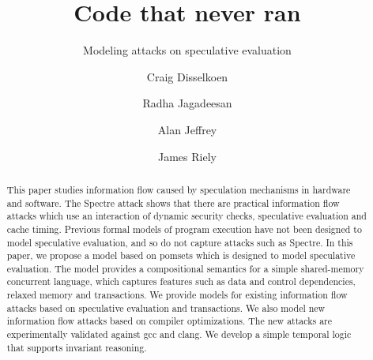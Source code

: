 \documentclass[acmsmall]{acmart}
\begin{document}
\title{Code that never ran}
\subtitle{Modeling attacks on speculative evaluation}

\author{Craig Disselkoen}

\author{Radha Jagadeesan}

\author{Alan Jeffrey}

\author{James Riely}

\begin{abstract}
  This paper studies information flow caused by speculation mechanisms
  in hardware and software.  The Spectre attack shows that there are
  practical information flow attacks which use an interaction of
  dynamic security checks, speculative evaluation and cache timing.
  Previous formal models of program execution have not been designed
  to model speculative evaluation, and so do not capture attacks such
  as Spectre. In this paper, we propose a model based on pomsets which
  is designed to model speculative evaluation. The model provides a
  compositional semantics for a simple shared-memory concurrent
  language, which captures features such as data and control
  dependencies, relaxed memory and transactions. We provide models for
  existing information flow attacks based on speculative evaluation
  and transactions.  We also model new information flow attacks based on compiler
  optimizations. The new attacks are experimentally validated against
  gcc and clang.  We develop a simple temporal logic that supports 
  invariant reasoning.
\end{abstract}

\maketitle










\clearpage
\appendix

\end{document}
